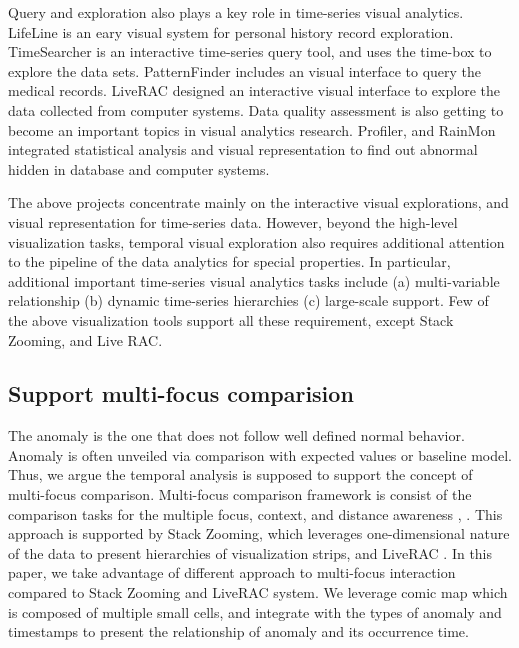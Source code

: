 \documentclass{vgtc}                          %
\begin{document}
	Query and exploration also plays a key role in time-series visual analytics. LifeLine\cite{plaisant1996lifelines} is an eary visual system for personal history record exploration. TimeSearcher\cite{hochheiser2004dynamic} is an interactive time-series query tool, and uses the time-box to explore the data sets. PatternFinder \cite{fails2006visual} includes an visual interface to query the medical records. LiveRAC \cite{mclachlan2008liverac} designed an interactive visual interface to explore the data collected from computer systems. Data quality assessment is also getting to become an important topics in visual analytics research. Profiler\cite{Kandel2012}, and RainMon\cite{shafer2012rainmon} integrated statistical analysis and visual representation to find out abnormal hidden in database and computer systems. 
	
	The above projects concentrate mainly on the interactive visual explorations, and visual representation for time-series data. However, beyond the high-level visualization tasks, temporal visual exploration also requires additional attention to the pipeline of the data analytics for special properties. In particular, additional important time-series visual analytics tasks include (a) multi-variable relationship (b) dynamic time-series hierarchies (c) large-scale support\cite{javed2010stack}. Few of the above visualization tools support all these requirement, except Stack Zooming\cite{javed2010stack}, and Live RAC\cite{mclachlan2008liverac}. 
	
\subsection{Support multi-focus comparision}

	The anomaly is the one that does not follow well defined normal behavior\cite{Chandola2009}. Anomaly is often unveiled via comparison with expected values or baseline model. Thus, we argue the temporal analysis is supposed to support the concept of multi-focus comparison. Multi-focus comparison framework is consist of the comparison tasks for the multiple focus, context, and distance awareness \cite{javed2010stack}, \cite{elmqvist2008melange}. This approach is supported by Stack Zooming\cite{javed2010stack}, which leverages one-dimensional nature of the data to present hierarchies of visualization strips, and LiveRAC \cite{mclachlan2008liverac}. In this paper, we take advantage of different approach to multi-focus interaction compared to Stack Zooming and LiveRAC system. We leverage comic map which is composed of multiple small cells, and integrate with the types of anomaly and timestamps to present the relationship of anomaly and its occurrence time. 
	
\end{document}
